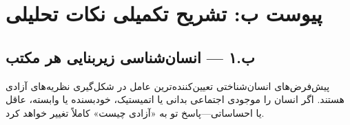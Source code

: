 \section{پیوست ب: تشریح تکمیلی نکات تحلیلی}
\label{app:analysis}

\subsection{ب.۱ — انسان‌شناسی زیربنایی هر مکتب}
\label{subsec:anthropology}

\begin{tcolorbox}[defbox, title={مقدمه: هر نظریه‌ی آزادی یک تصویر از انسان دارد}]
پیش‌فرض‌های انسان‌شناختی تعیین‌کننده‌ترین عامل در شکل‌گیری نظریه‌های آزادی هستند. اگر انسان را موجودی اجتماعی بدانی یا اتمیستیک، خودبسنده یا وابسته، عاقل یا احساساتی—پاسخ تو به «آزادی چیست» کاملاً تغییر خواهد کرد.
\end{tcolorbox}

\vspace{0.5cm}

